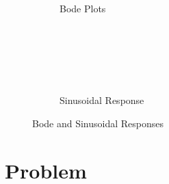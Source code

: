 \documentclass[titlepage, 11pt, reqno]{article}    %
\begin{document}
\begin{figure}[h]
    \centering
    \begin{subfigure}{0.45\textwidth}
        \centering
        \begin{subfigure}[htbp]{\textwidth} 
            
        \end{subfigure}\\
        \begin{subfigure}[htbp]{\textwidth} 
            
        \end{subfigure} \\
        \begin{subfigure}[htbp]{\textwidth} 
            
        \end{subfigure} 
        \caption{Bode Plots}~\label{fig:bode_match}
    \end{subfigure}\quad
    \begin{subfigure}{0.45\textwidth}
        \centering
        \begin{subfigure}[htbp]{\textwidth} 
            
        \end{subfigure}\\
        \begin{subfigure}[htbp]{\textwidth} 
            
        \end{subfigure} \\
        \begin{subfigure}[htbp]{\textwidth} 
            
        \end{subfigure} 
        \caption{Sinusoidal Response}~\label{fig:sinusoidal_match}
    \end{subfigure}
    \caption{ Bode and Sinusoidal Responses}
\end{figure}
\clearpage
\section{Problem}
\end{document}
